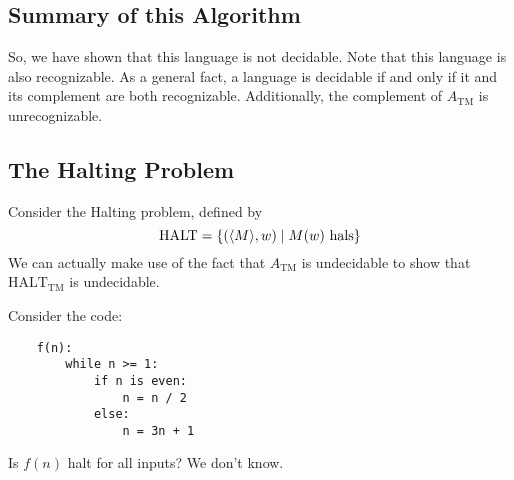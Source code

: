 \documentclass[letterpaper]{article}
\begin{document}
\subsection{Summary of this Algorithm}
So, we have shown that this language is not decidable. Note that this language is also recognizable. As a general fact, a language is decidable if and only if it and its complement are both recognizable. Additionally, the complement of $A_{\text{TM}}$ is unrecognizable. 

\subsection{The Halting Problem}
Consider the Halting problem, defined by 
\[\text{HALT} = \{(\langle M \rangle, w) \mid M(w) \text{ hals}\}\]
We can actually make use of the fact that $A_{\text{TM}}$ is undecidable to show that $\text{HALT}_{\text{TM}}$ is undecidable.

\bigskip 

Consider the code: 
\begin{verbatim}
    f(n):
        while n >= 1:
            if n is even: 
                n = n / 2
            else:
                n = 3n + 1
\end{verbatim}
Is $f(n)$ halt for all inputs? We don't know. 
\end{document}
